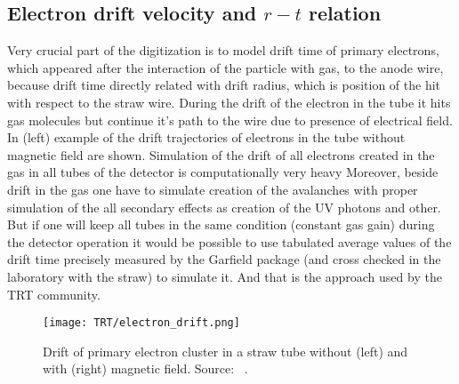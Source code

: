 \subsection{Electron drift velocity and $r-t$ relation}

Very crucial part of the digitization is to model drift time of primary electrons, which appeared after the interaction of the particle with gas, to the anode wire, because drift time directly related with drift radius, which is position of the hit with respect to the straw wire.
During the drift of the electron in the tube it hits gas molecules but continue it's path to the wire due to presence of electrical field.
In  (left) example of the drift trajectories of electrons in the tube without magnetic field are shown.
Simulation of the drift of all electrons created in the gas in all tubes of the detector is computationally very heavy
Moreover, beside drift in the gas one have to simulate creation of the avalanches with proper simulation of the all secondary effects
as creation of the UV photons and other. But if one will keep all tubes in the same condition (constant gas gain) during the detector operation it would
be possible to use tabulated average values of the drift time precisely measured by the Garfield package (and cross checked in the laboratory with the straw) to simulate it.
And that is the approach used by the TRT community. 

\begin{figure}
\begin{center}
 \texttt{[image: TRT/electron\_drift.png]}
\caption {Drift of primary electron cluster in a straw tube without (left) and with (right) magnetic field. Source: ~\cite{cwetanski_thesis}. 
}
\end{center}
\label{fig:clusterDriftInTube}
\end{figure}

